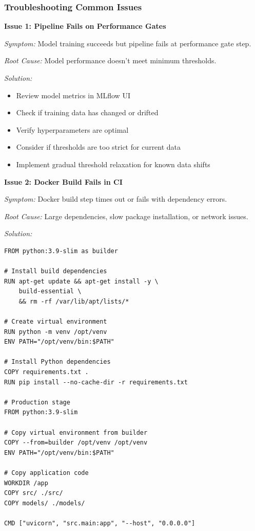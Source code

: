 \subsubsection*{Troubleshooting Common Issues}

\textbf{Issue 1: Pipeline Fails on Performance Gates}

\textit{Symptom:} Model training succeeds but pipeline fails at performance gate step.

\textit{Root Cause:} Model performance doesn't meet minimum thresholds.

\textit{Solution:}
\begin{itemize}
    \item Review model metrics in MLflow UI
    \item Check if training data has changed or drifted
    \item Verify hyperparameters are optimal
    \item Consider if thresholds are too strict for current data
    \item Implement gradual threshold relaxation for known data shifts
\end{itemize}

\textbf{Issue 2: Docker Build Fails in CI}

\textit{Symptom:} Docker build step times out or fails with dependency errors.

\textit{Root Cause:} Large dependencies, slow package installation, or network issues.

\textit{Solution:}
\begin{lstlisting}[style=docker, caption=Optimized Dockerfile]
FROM python:3.9-slim as builder

# Install build dependencies
RUN apt-get update && apt-get install -y \
    build-essential \
    && rm -rf /var/lib/apt/lists/*

# Create virtual environment
RUN python -m venv /opt/venv
ENV PATH="/opt/venv/bin:$PATH"

# Install Python dependencies
COPY requirements.txt .
RUN pip install --no-cache-dir -r requirements.txt

# Production stage
FROM python:3.9-slim

# Copy virtual environment from builder
COPY --from=builder /opt/venv /opt/venv
ENV PATH="/opt/venv/bin:$PATH"

# Copy application code
WORKDIR /app
COPY src/ ./src/
COPY models/ ./models/

CMD ["uvicorn", "src.main:app", "--host", "0.0.0.0"]
\end{lstlisting}

